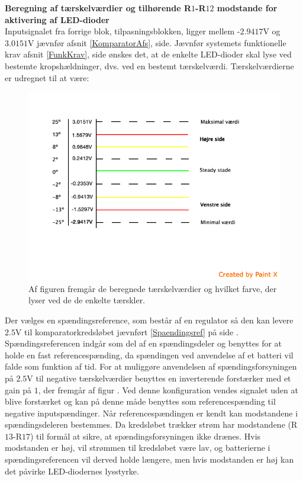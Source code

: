 \noindent\textbf{Beregning af tærskelværdier og tilhørende R$1$-R$12$ modstande for aktivering af LED-dioder} \\
Inputsignalet fra forrige blok, tilpasningsblokken, ligger mellem -$2.9417$V og $3.0151$V jævnfør afsnit \ref{KomparatorAfs}, side\pageref{KomparatorAfs}. Jævnfør systemets funktionelle krav afsnit \ref{FunkKrav}, side \pageref{FunkKrav} ønskes det, at de enkelte LED-dioder skal lyse ved bestemte kropshældninger, dvs. ved en bestemt tærskelværdi. 
Tærskelværdierne er udregnet til at være:
\begin{figure}[H]
	\centering
	\includegraphics[scale=0.5]{figures/cProblemloesning/Taerskelvaerdier.PNG}
	\caption{Af figuren fremgår de beregnede tærskelværdier og hvilket farve, der lyser ved de de enkelte tærskler.}
	\label{fig:taerskelvaerdier}
\end{figure}

Der vælges en  spændingsreference, som består af en regulator så den kan levere $2.5$V til komparatorkredsløbet jævnført \ref{Spaendingsref} på side \pageref{Spaendingsref}. Spændingsreferencen indgår som del af en spændingsdeler og benyttes for at holde en fast referencespænding, da spændingen ved anvendelse af et batteri vil falde som funktion af tid. For at muliggøre anvendelsen af spændingsforsyningen på $2.5$V til negative tærskelværdier benyttes en inverterende forstærker med et gain på $1$, der fremgår af figur . Ved denne konfiguration vendes signalet uden at blive forstærket og kan på denne måde benyttes som referencespænding til negative inputspændinger.  
Når referencespændingen er kendt kan modstandene i spændingsdeleren bestemmes. Da kredsløbet trækker strøm har modstandene (R$13$-R$17$) til formål at sikre, at spændingsforsyningen ikke drænes. Hvis modstanden er høj, vil strømmen til kredsløbet være lav, og batterierne i spændingsreferencen vil derved holde længere, men hvis modstanden er høj kan det påvirke LED-diodernes lysstyrke.

